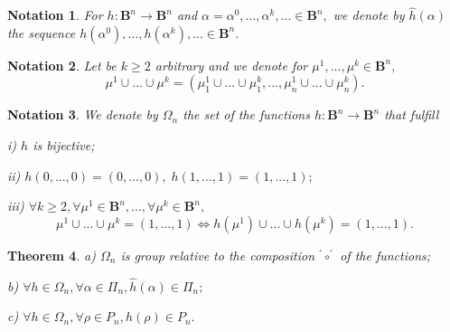 \documentclass[12pt]{article}\usepackage{amsmath}
\newtheorem{theorem}{Theorem}
\newtheorem{notation}[theorem]{Notation}
\begin{document}
\begin{notation}
For $h:\mathbf{B}^{n}\rightarrow\mathbf{B}^{n}$ and $\alpha=\alpha
^{0},...,\alpha^{k},...\in\mathbf{B}^{n},$ we denote by $\widehat{h}(\alpha)$
the sequence $h(\alpha^{0}),...,h(\alpha^{k}),...\in\mathbf{B}^{n}.$
\end{notation}

\begin{notation}
Let be $k\geq2$ arbitrary and we denote for $\mu^{1},...,\mu^{k}\in
\mathbf{B}^{n},$\[
\mu^{1}\cup...\cup\mu^{k}=(\mu_{1}^{1}\cup...\cup\mu_{1}^{k},...,\mu_{n}^{1}\cup...\cup\mu_{n}^{k}).
\]

\end{notation}

\begin{notation}
We denote by $\Omega_{n}$ the set of the functions $h:\mathbf{B}^{n}\rightarrow\mathbf{B}^{n}$ that fulfill

i) $h$ is bijective;

ii) $h(0,...,0)=(0,...,0),\;h(1,...,1)=(1,...,1);$

iii) $\forall k\geq2,\forall\mu^{1}\in\mathbf{B}^{n},...,\forall\mu^{k}\in\mathbf{B}^{n},$\[
\mu^{1}\cup...\cup\mu^{k}=(1,...,1)\Longleftrightarrow h(\mu^{1})\cup...\cup
h(\mu^{k})=(1,...,1).
\]

\end{notation}

\begin{theorem}
\label{The59}a) $\Omega_{n}$ is group relative to the composition $^{\prime
}\circ^{\prime}$ of the functions;

b) $\forall h\in\Omega_{n},\forall\alpha\in\Pi_{n},\widehat{h}(\alpha)\in
\Pi_{n};$

c) $\forall h\in\Omega_{n},\forall\rho\in P_{n},h(\rho)\in P_{n}.$
\end{theorem}
\end{document}
